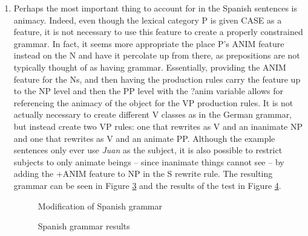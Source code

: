 \documentclass{article}
\newcommand{\lexi}[1]{\textit{#1}}
\newcommand{\treefig}[3]{
    \begin{figure}
      \caption{#1}
      \label{fig:#2}
      \centering
      \texttt{[image: \#3]}
    \end{figure}
  }
\begin{document}
\begin{enumerate}
    Sentences \ref{sent:germ_good_intrans} and \ref{sent:germ_good_trans} succeed, though, and yield the trees in Figures \ref{fig:germ_tree_intrans} and \ref{fig:germ_tree_trans}.
    \treefig{der Hund kommt}{germ_tree_intrans}{derHundkommt.ps}
    \treefig{der Hund folgt mir}{germ_tree_trans}{derHundfolgtmir.ps}
    \item Perhaps the most important thing to account for in the Spanish sentences is animacy.
    Indeed, even though the lexical category P is given CASE as a feature, it is not necessary to use this feature to create a properly constrained grammar.
    In fact, it seems more appropriate the place P's ANIM feature instead on the N and have it percolate up from there, as prepositions are not typically thought of as having grammar.
    Essentially, providing the ANIM feature for the Ns, and then having the production rules carry the feature up to the NP level and then the PP level with the ?anim variable allows for referencing the animacy of the object for the VP production rules.
    It is not actually necessary to create different V classes as in the German grammar, but instead create two VP rules: one that rewrites as V and an inanimate NP and one that rewrites as V and an animate PP.
    Although the example sentences only ever use \lexi{Juan} as the subject, it is also possible to restrict subjects to only animate beings -- since inanimate things cannot see -- by adding the +ANIM feature to NP in the S rewrite rule.
    The resulting grammar can be seen in Figure \ref{fig:span_grammar} and the results of the test in Figure \ref{fig:span_results}.
    \begin{figure}
      \caption{Modification of Spanish grammar}
      \label{fig:span_grammar}
      
    \end{figure}
    \begin{figure}
      \caption{Spanish grammar results}
      \label{fig:span_results}
      
    \end{figure}
  \end{enumerate}
\end{document}
